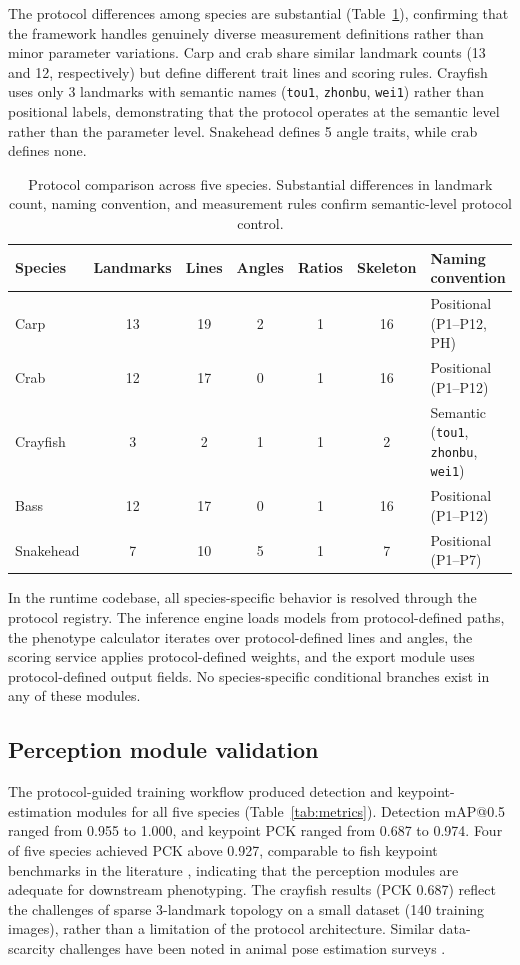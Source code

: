 \documentclass[final,3p,times]{elsarticle}
\begin{document}
The protocol differences among species are substantial (Table~\ref{tab:protocol_comparison}), confirming that the framework handles genuinely diverse measurement definitions rather than minor parameter variations. Carp and crab share similar landmark counts (13 and 12, respectively) but define different trait lines and scoring rules. Crayfish uses only 3 landmarks with semantic names (\texttt{tou1}, \texttt{zhonbu}, \texttt{wei1}) rather than positional labels, demonstrating that the protocol operates at the semantic level rather than the parameter level. Snakehead defines 5 angle traits, while crab defines none.

\begin{table}[htbp]
  \centering
  \caption{Protocol comparison across five species. Substantial differences in landmark count, naming convention, and measurement rules confirm semantic-level protocol control.}
  \label{tab:protocol_comparison}
  \small
  \begin{tabular}{lcccccl}
    \toprule
    Species & Landmarks & Lines & Angles & Ratios & Skeleton & Naming convention \\
    \midrule
    Carp & 13 & 19 & 2 & 1 & 16 & Positional (P1--P12, PH) \\
    Crab & 12 & 17 & 0 & 1 & 16 & Positional (P1--P12) \\
    Crayfish & 3 & 2 & 1 & 1 & 2 & Semantic (\texttt{tou1}, \texttt{zhonbu}, \texttt{wei1}) \\
    Bass & 12 & 17 & 0 & 1 & 16 & Positional (P1--P12) \\
    Snakehead & 7 & 10 & 5 & 1 & 7 & Positional (P1--P7) \\
    \bottomrule
  \end{tabular}
\end{table}

In the runtime codebase, all species-specific behavior is resolved through the protocol registry. The inference engine loads models from protocol-defined paths, the phenotype calculator iterates over protocol-defined lines and angles, the scoring service applies protocol-defined weights, and the export module uses protocol-defined output fields. No species-specific conditional branches exist in any of these modules.

\subsection{Perception module validation}

The protocol-guided training workflow produced detection and keypoint-estimation modules for all five species (Table~\ref{tab:metrics}). Detection mAP@0.5 ranged from 0.955 to 1.000, and keypoint PCK ranged from 0.687 to 0.974. Four of five species achieved PCK above 0.927, comparable to fish keypoint benchmarks in the literature \citep{liu2024fishphenokey,ge2024cefish}, indicating that the perception modules are adequate for downstream phenotyping. The crayfish results (PCK 0.687) reflect the challenges of sparse 3-landmark topology on a small dataset (140 training images), rather than a limitation of the protocol architecture. Similar data-scarcity challenges have been noted in animal pose estimation surveys \citep{lin2025keypoint}.
\end{document}
